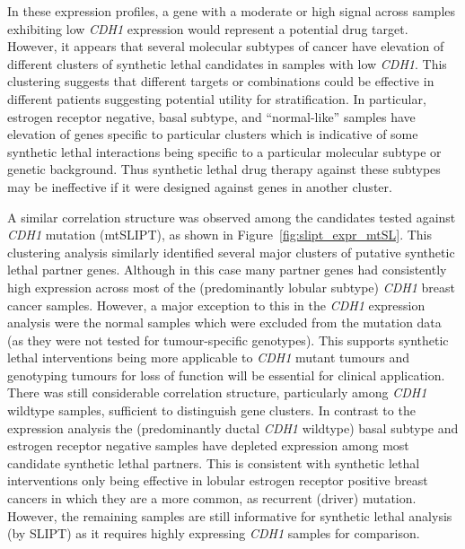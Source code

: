 In these expression profiles, a gene with a moderate or high signal across samples exhibiting low \textit{CDH1} expression would represent a potential drug target. However, it appears that several molecular subtypes of cancer have elevation of different clusters of synthetic lethal candidates in samples with low \textit{CDH1}. This clustering suggests that different targets or combinations could be effective in different patients suggesting potential utility for stratification.  In particular, estrogen receptor negative, basal subtype, and ``normal-like'' samples \cite{Eroles2012, Parker2009, Dai2015} have elevation of genes specific to particular clusters which is indicative of some synthetic lethal interactions being specific to a particular molecular subtype or genetic background. Thus synthetic lethal drug therapy against these subtypes may be ineffective if it were designed against genes in another cluster.
 

A similar correlation structure was observed among the candidates tested against \textit{CDH1} mutation (mtSLIPT), as shown in Figure~\ref{fig:slipt_expr_mtSL}. This clustering analysis similarly identified several major clusters of putative synthetic lethal partner genes. Although in this case many partner genes had consistently high expression across most of the (predominantly lobular subtype) \textit{CDH1} breast cancer samples. However, a major exception to this in the \textit{CDH1} expression analysis were the normal samples which were excluded from the mutation data (as they were not tested for tumour-specific genotypes). This supports synthetic lethal interventions being more applicable to \textit{CDH1} mutant tumours and genotyping tumours for loss of function will be essential for clinical application. There was still considerable correlation structure, particularly among \textit{CDH1} wildtype samples, sufficient to distinguish gene clusters. In contrast to the expression analysis the (predominantly ductal \textit{CDH1} wildtype) basal subtype and estrogen receptor negative samples have depleted expression among most candidate synthetic lethal partners. This is consistent with synthetic lethal interventions only being effective in lobular estrogen receptor positive breast cancers in which they are a more common, as recurrent (driver) mutation. However, the remaining samples are still informative for synthetic lethal analysis (by \gls{SLIPT}) as it requires highly expressing \textit{CDH1} samples for comparison.

